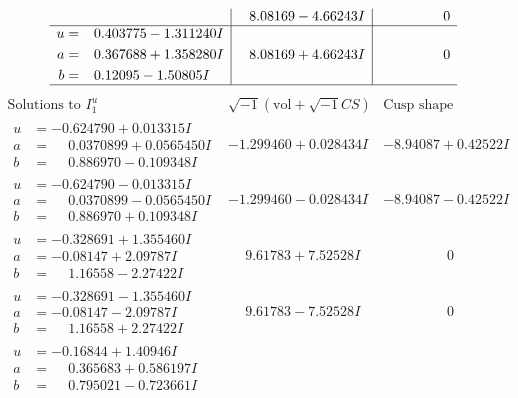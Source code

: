 \documentclass[1p]{elsarticle_modified}
\theoremstyle{definition}
\newcommand{\I}{\sqrt{-1}}
\begin{document}
$$\begin{array}{c|c|c}
 & \phantom{-}8.08169 - 4.66243 I & \phantom{-0.000000 } 0 \\ \hline\begin{aligned}
u &= \phantom{-}0.403775 - 1.311240 I \\
a &= \phantom{-}0.367688 + 1.358280 I \\
b &= \phantom{-}0.12095 - 1.50805 I\end{aligned}
 & \phantom{-}8.08169 + 4.66243 I & \phantom{-0.000000 } 0\\
 \hline 
 \end{array}$$\newpage$$\begin{array}{c|c|c}  
\text{Solutions to }I^u_{1}& \I (\text{vol} + \sqrt{-1}CS) & \text{Cusp shape}\\
 \hline 
\begin{aligned}
u &= -0.624790 + 0.013315 I \\
a &= \phantom{-}0.0370899 + 0.0565450 I \\
b &= \phantom{-}0.886970 - 0.109348 I\end{aligned}
 & -1.299460 + 0.028434 I & -8.94087 + 0.42522 I \\ \hline\begin{aligned}
u &= -0.624790 - 0.013315 I \\
a &= \phantom{-}0.0370899 - 0.0565450 I \\
b &= \phantom{-}0.886970 + 0.109348 I\end{aligned}
 & -1.299460 - 0.028434 I & -8.94087 - 0.42522 I \\ \hline\begin{aligned}
u &= -0.328691 + 1.355460 I \\
a &= -0.08147 + 2.09787 I \\
b &= \phantom{-}1.16558 - 2.27422 I\end{aligned}
 & \phantom{-}9.61783 + 7.52528 I & \phantom{-0.000000 } 0 \\ \hline\begin{aligned}
u &= -0.328691 - 1.355460 I \\
a &= -0.08147 - 2.09787 I \\
b &= \phantom{-}1.16558 + 2.27422 I\end{aligned}
 & \phantom{-}9.61783 - 7.52528 I & \phantom{-0.000000 } 0 \\ \hline\begin{aligned}
u &= -0.16844 + 1.40946 I \\
a &= \phantom{-}0.365683 + 0.586197 I \\
b &= \phantom{-}0.795021 - 0.723661 I\end{aligned}

\end{array}$$
\end{document}
